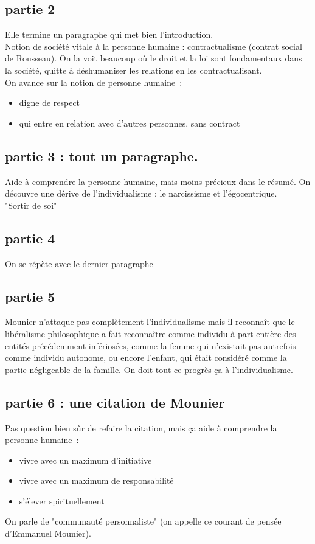 \subsection{partie 2}
Elle termine un paragraphe qui met bien l'introduction.\\
Notion de société vitale à la personne humaine : contractualisme (contrat social de Rousseau). On la voit beaucoup où le droit et la loi sont fondamentaux dans la société, quitte à déshumaniser les relations en les contractualisant.\\
On avance sur la notion de personne humaine~:
\begin{itemize}
    \item digne de respect
    \item qui entre en relation avec d'autres personnes, sans contract
\end{itemize}

\subsection{partie 3 : tout un paragraphe.}
Aide à comprendre la personne humaine, mais moins précieux dans le résumé. On découvre une dérive de l'individualisme : le narcissisme et l'égocentrique.\\
"Sortir de soi"

\subsection{partie 4}
On se répète avec le dernier paragraphe

\subsection{partie 5}

Mounier n'attaque pas complètement l'individualisme mais il reconnaît que le libéralisme philosophique a fait reconnaître comme individu à part entière des entités précédemment infériosées, comme la femme qui n'existait pas autrefois comme individu autonome, ou encore l'enfant, qui était considéré comme la partie négligeable de la famille. On doit tout ce progrès ça à l'individualisme.

\subsection{partie 6 : une citation de Mounier}
Pas question bien sûr de refaire la citation, mais ça aide à comprendre la personne humaine~:
\begin{itemize}
    \item vivre avec un maximum d'initiative
    \item vivre avec un maximum de responsabilité
    \item s'élever spirituellement
\end{itemize}
On parle de "communauté personnaliste" (on appelle ce courant de pensée d'Emmanuel Mounier).

